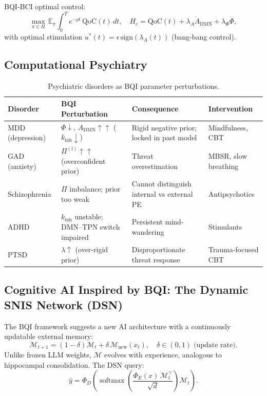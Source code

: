\documentclass[12pt,a4paper]{article}
\theoremstyle{plain}
\theoremstyle{definition}
\theoremstyle{remark}
\newcommand{\DMN}{\mathrm{DMN}}
\newcommand{\E}{\mathbb{E}}
\newcommand{\softmax}{\operatorname{softmax}}
\newcommand{\QoC}{\mathrm{QoC}}
\begin{document}
BQI-BCI optimal control:
\begin{equation}
\max_{\pi\in\Pi}\,\E_\pi\!\int_0^T e^{-\rho t}\,\QoC(t)\,dt,
\quad H_c = \QoC(t) + \lambda_A\dot{A}_\mathrm{DMN} + \lambda_\Phi\dot\Phi,
\end{equation}
with optimal stimulation $u^*(t) = \epsilon\,\mathrm{sign}(\lambda_A(t))$ (bang-bang control).

\subsection{Computational Psychiatry}

\begin{table}[htbp]
\centering
\caption{Psychiatric disorders as BQI parameter perturbations.}
\label{tab:psychiatry}
\renewcommand{\arraystretch}{1.35}
\begin{tabular}{p{2.2cm}p{3.2cm}p{3.5cm}p{3.5cm}}
\toprule
\rowcolor{hdrcol}
\color{white}\textbf{Disorder} &
\color{white}\textbf{BQI Perturbation} &
\color{white}\textbf{Consequence} &
\color{white}\textbf{Intervention} \\
\midrule
MDD (depression) & $\Phi{\downarrow}$, $A_{\DMN}{\uparrow\uparrow}$ ($k_{\text{inh}}{\downarrow}$) & Rigid negative prior; locked in past model & Mindfulness, CBT \\
GAD (anxiety)    & $\Pi^{(l)}{\uparrow\uparrow}$ (overconfident prior) & Threat overestimation & MBSR, slow breathing \\
Schizophrenia    & $\Pi$ imbalance; prior too weak & Cannot distinguish internal vs external PE & Antipsychotics \\
ADHD             & $k_{\text{inh}}$ unstable; DMN--TPN switch impaired & Persistent mind-wandering & Stimulants \\
PTSD             & $\lambda{\uparrow}$ (over-rigid prior) & Disproportionate threat response & Trauma-focused CBT \\
\bottomrule
\end{tabular}
\end{table}

\subsection{Cognitive AI Inspired by BQI: The Dynamic SNIS Network (DSN)}

The BQI framework suggests a new AI architecture with a continuously updatable external memory:
\begin{equation}
  \mathcal{M}_{t+1} = (1-\delta)\mathcal{M}_t + \delta\,\mathcal{M}_{\text{new}}(x_t),\quad
  \delta \in (0,1)\;\text{(update rate)}.
\end{equation}
Unlike frozen LLM weights, $\mathcal{M}$ evolves with experience, analogous to hippocampal
consolidation. The DSN query:
\begin{equation}
  \hat{y} = \Phi_D\!\left(\softmax\!\left(\frac{\Phi_E(x)\,\mathcal{M}_t^\top}{\sqrt{d}}\right)\mathcal{M}_t\right).
\end{equation}
\end{document}

